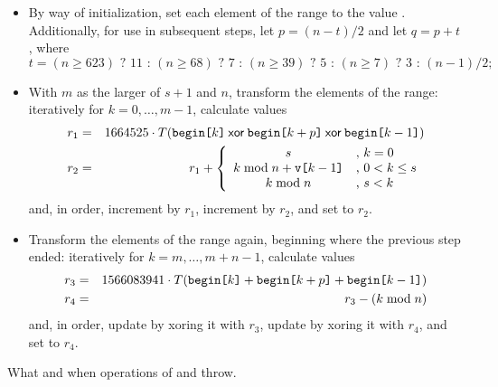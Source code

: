 \begin{itemdescr}
\begin{itemize}
 \item
   By way of initialization,
   set each element of the range to the value .
   Additionally,
   for use in subsequent steps,
   let $p = (n - t) / 2$
   and let $q = p + t$,
   where
   \[%
     t = (n \ge 623) \mbox{ ? } 11 \mbox{ : } (n \ge 68) \mbox{ ? } 7 \mbox{ : } (n \ge 39) \mbox{ ? } 5 \mbox{ : } (n \ge 7) \mbox{ ? } 3 \mbox{ : } (n - 1)/2;
   \]%
 \item
   With $m$ as the larger of $s + 1$ and $n$,
   transform the elements of the range:
   iteratively for $k = 0, \dotsc, m - 1$,
   calculate values
   \begin{eqnarray*}
     r_1 & = &
       1664525 \cdot T(    \tcode{begin[}k\tcode{]}
                      \xor \tcode{begin[}k+p\tcode{]}
                      \xor \tcode{begin[}k-1 \tcode{]}
                      )
     \\
     r_2 & = & r_1 + \left\{
       \begin{array}{cl}
         s                                  & \mbox{,  } k = 0
         \\
         k \bmod n + \tcode{v[}k-1\tcode{]} & \mbox{,  } 0 < k \le s
         \\
         k \bmod n                          & \mbox{,  } s < k
       \end{array}
     \right.
   \end{eqnarray*}
   and, in order,
   increment  by $r_1$,
   increment  by $r_2$,
   and
   set  to $r_2$.
 \item
   Transform the elements of the range again,
   beginning where the previous step ended:
   iteratively for $k = m, \dotsc, m + n - 1$,
   calculate values
   \begin{eqnarray*}
     r_3 & = &
       1566083941 \cdot T( \tcode{begin[}k  \tcode{]}
                         + \tcode{begin[}k+p\tcode{]}
                         + \tcode{begin[}k-1\tcode{]}
                         )
     \\
     r_4 & = & r_3 - (k \bmod n)
   \end{eqnarray*}
   and, in order,
   \noindent
   update  by xoring it with $r_3$,
   update  by xoring it with $r_4$,
   and
   set  to $r_4$.
\end{itemize}

\pnum
\throws
What and when  operations of 
and  throw.
\end{itemdescr}

